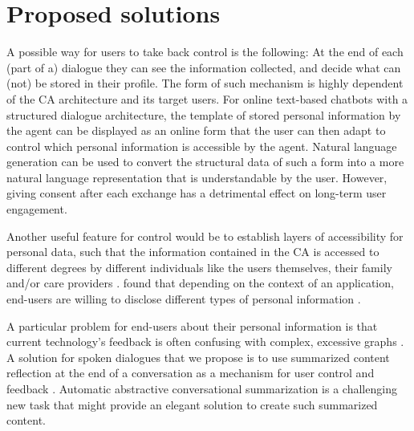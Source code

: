 \documentclass[sigchi-a,nonacm]{acmart}
\begin{document}
\section{Proposed solutions}
A possible way for users to take back control is the following: At the end of each (part of a) dialogue they can see the information collected, and decide what can (not) be stored in their profile.
The form of such mechanism is highly dependent of the CA architecture and its target users. For online text-based chatbots with a structured dialogue architecture, the template of stored personal information by the agent can be displayed as an online form that the user can then adapt to control which personal information is accessible by the agent. Natural language generation can be used to convert the structural data of such a form into a more natural language representation that is understandable by the user. However, giving consent after each exchange has a detrimental effect on long-term user engagement.

Another useful feature for control would be to establish layers of accessibility for personal data, such that the information contained in the CA is accessed to different degrees by different individuals like the users themselves, their family and/or care providers \cite{kim2018HowMultilevelPrivacy}. \citeauthor{marmion2019WillingnessCrowdsCohort, rapp2016PersonalInformaticsEveryday} found that depending on the context of an application, end-users are willing to disclose different types of personal information \cite{marmion2019WillingnessCrowdsCohort}.

A particular problem for end-users about their personal information is that current technology's feedback is often confusing with complex, excessive graphs \cite{rapp2016PersonalInformaticsEveryday}. A solution for spoken dialogues that we propose is to use summarized content reflection at the end of a conversation as a mechanism for user control and feedback \cite{razavi2019dialogue}. Automatic abstractive conversational summarization is a challenging new task \cite{zhao-2020-improving} that might provide an elegant solution to create such summarized content.

\end{document}
